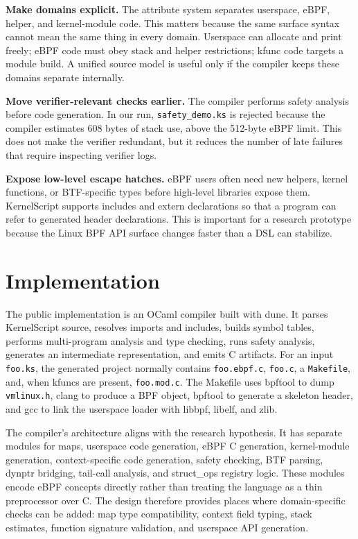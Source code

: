\documentclass[10pt,twocolumn]{article}
\newcommand{\tool}{KernelScript}
\begin{document}
\textbf{Make domains explicit.}  The attribute system separates userspace,
eBPF, helper, and kernel-module code.  This matters because the same surface
syntax cannot mean the same thing in every domain.  Userspace can allocate and
print freely; eBPF code must obey stack and helper restrictions; kfunc code
targets a module build.  A unified source model is useful only if the compiler
keeps these domains separate internally.

\textbf{Move verifier-relevant checks earlier.}  The compiler performs safety
analysis before code generation.  In our run, \texttt{safety\_demo.ks} is
rejected because the compiler estimates 608 bytes of stack use, above the
512-byte eBPF limit.  This does not make the verifier redundant, but it reduces
the number of late failures that require inspecting verifier logs.

\textbf{Expose low-level escape hatches.}  eBPF users often need new helpers,
kernel functions, or BTF-specific types before high-level libraries expose
them.  \tool{} supports includes and extern declarations so that a program can
refer to generated header declarations.  This is important for a research
prototype because the Linux BPF API surface changes faster than a DSL can
stabilize.

\section{Implementation}

The public implementation is an OCaml compiler built with dune.  It parses
\tool{} source, resolves imports and includes, builds symbol tables, performs
multi-program analysis and type checking, runs safety analysis, generates an
intermediate representation, and emits C artifacts.  For an input
\texttt{foo.ks}, the generated project normally contains \texttt{foo.ebpf.c},
\texttt{foo.c}, a \texttt{Makefile}, and, when kfuncs are present,
\texttt{foo.mod.c}.  The Makefile uses bpftool to dump \texttt{vmlinux.h},
clang to produce a BPF object, bpftool to generate a skeleton header, and gcc
to link the userspace loader with libbpf, libelf, and zlib.

The compiler's architecture aligns with the research hypothesis.  It has
separate modules for maps, userspace code generation, eBPF C generation,
kernel-module generation, context-specific code generation, safety checking,
BTF parsing, dynptr bridging, tail-call analysis, and struct\_ops registry
logic.  These modules encode eBPF concepts directly rather than treating the
language as a thin preprocessor over C.  The design therefore provides places
where domain-specific checks can be added: map type compatibility, context
field typing, stack estimates, function signature validation, and userspace
API generation.
\end{document}
